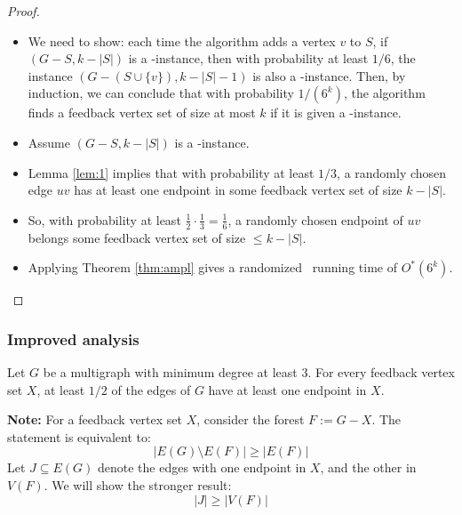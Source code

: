 \begin{frame}[c]
    \begin{proof}
        \begin{itemize}
            \item We need to show: each time the algorithm adds a vertex $v$ to $S$, if $(G-S,k-|S|)$ is a \Yes-instance, then with probability at least $1/6$, the instance $(G-(S\cup \{v\}),k-|S|-1)$ is also a \Yes-instance. Then, by induction, we can conclude that with probability $1/(6^k)$, the algorithm finds a feedback vertex set of size at most $k$ if it is given a \Yes-instance.
            \pause
            \item Assume $(G-S,k-|S|)$ is a \Yes-instance.
            \item Lemma \ref{lem:1} implies that with probability at least $1/3$, a randomly chosen edge $uv$ has at least one endpoint in some feedback vertex set of size $k-|S|$.
            \item So, with probability at least $\frac{1}{2} \cdot \frac{1}{3} = \frac{1}{6}$, a randomly chosen endpoint of $uv$ belongs some feedback vertex set of size $\le k-|S|$. 
            \pause
            \item Applying Theorem \ref{thm:ampl} gives a randomized \FPT\ running time of $O^*(6^k)$.
        \end{itemize}
        
    \end{proof}
\end{frame}


\begin{frame}[c]\frametitle{Improved analysis}
    \begin{lemma}
        Let $G$ be a multigraph with minimum degree at least 3. For every feedback vertex set $X$, at least $1/2$ of the edges of $G$ have at least one endpoint in $X$. 
    \end{lemma}
    \pause

	\noindent
    \textbf{Note:} For a feedback vertex set $X$, consider the forest $F := G - X$. The statement is equivalent to:
    \[|E(G) \setminus E(F) |\ge |E(F)|\]  
    Let $J \subseteq E(G)$ denote the edges with one endpoint in $X$, and the other in $V(F)$. We will show the stronger result:
    \[ |J| \ge |V(F)|\]
\end{frame}


